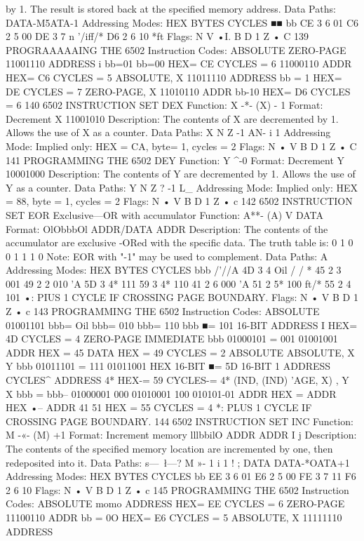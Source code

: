\documentclass{book}
\begin{document}
by 1. The result is stored back at the specified memory address.
Data Paths:
DATA-M5ATA-1
Addressing Modes:
HEX
BYTES
CYCLES
■■ bb
CE
3
6
01
C6
2
5
00
DE
3
7
n
'/iff/*
D6
2
6
10
*ft
Flags:
N V
•I.
B D 1 Z
•
C
139
PROGRAAAAAING THE 6502
Instruction Codes:
ABSOLUTE
ZERO-PAGE
11001110 ADDRESS
i
bb=01
bb=00
HEX= CE CYCLES = 6
11000110 ADDR
HEX= C6 CYCLES = 5
ABSOLUTE, X 11011110 ADDRESS
bb = 1 HEX= DE CYCLES = 7
ZERO-PAGE, X 11010110 ADDR
bb-10 HEX= D6 CYCLES = 6
140
6502 INSTRUCTION SET
DEX
Function:
X -*- (X) - 1
Format:
Decrement X
11001010
Description:
The contents of X are decremented by 1. Allows the use of X as
a counter.
Data Paths:
X
N
Z
-1
AN-
i
1
Addressing Mode:
Implied only:
HEX = CA, byte= 1, cycles = 2
Flags:
N
•
V B D 1 Z
•
C
141
PROGRAMMING THE 6502
DEY
Function:
Y ^-0
Format:
Decrement Y
10001000
Description:
The contents of Y are decremented by 1. Allows the use of Y as
a counter.
Data Paths:
Y
N
Z
{}?
-1
L_
Addressing Mode:
Implied only:
HEX = 88, byte = 1, cycles = 2
Flags:
N
•
V B D 1 Z
•
c
142
6502 INSTRUCTION SET
EOR Exclusive—OR with accumulator
Function:
A**- (A) V DATA
Format:
OlObbbOl ADDR/DATA ADDR
Description:
The contents of the accumulator are exclusive -ORed with the
specific data. The truth table is:
0
1
0
0
1
1
1
0
Note: EOR with "-1" may be used to complement.
Data Paths: A
Addressing Modes:
HEX
BYTES
CYCLES
bbb
/'//A
4D
3
4
Oil
/ / *
45
2
3
001
49
2
2
010
'A
5D
3
4*
111
59
3
4*
110
41
2
6
000
'A
51
2
5*
100
ft/*
55
2
4
101
•: PIUS 1 CYCLE IF CROSSING PAGE BOUNDARY.
Flags:
N
•
V B D 1 Z
•
c
143
PROGRAMMING THE 6502
Instruction Codes:
ABSOLUTE 01001101
bbb= Oil
bbb= 010
bbb= 110
bbb ■= 101
16-BIT ADDRESS
I
HEX= 4D CYCLES = 4
ZERO-PAGE
IMMEDIATE
bbb
01000101
= 001
01001001
ADDR
HEX = 45
DATA
HEX = 49 CYCLES = 2
ABSOLUTE
ABSOLUTE,
X
Y
bbb
01011101
= 111
01011001
HEX
16-BIT
■= 5D
16-BIT
1
ADDRESS
CYCLES^
ADDRESS
4*
HEX-= 59 CYCLES-= 4*
(IND,
(IND)
'AGE,
X)
, Y
X
bbb =
bbb--
01000001
000
01010001
100
010101-01
ADDR
HEX =
ADDR
HEX •--
ADDR
41
51
HEX = 55 CYCLES = 4
*: PLUS 1 CYCLE IF CROSSING PAGE BOUNDARY.
144
6502 INSTRUCTION SET
INC
Function:
M -«- (M) +1
Format:
Increment memory
lllbbilO ADDR ADDR I
j
Description:
The contents of the specified memory location are incremented
by one, then redeposited into it.
Data Paths:
s—\
\l—?
M »-
1
i 1
! ;
DATA DATA-*OATA+1
Addressing Modes:
HEX
BYTES
CYCLES
bb
EE
3
6
01
E6
2
5
00
FE
3
7
11
F6
2
6
10
Flags:
N
•
V B D 1 Z
•
c
145
PROGRAMMING THE 6502
Instruction Codes:
ABSOLUTE momo ADDRESS
HEX= EE CYCLES = 6
ZERO-PAGE 11100110 ADDR
bb = 0O HEX= E6 CYCLES = 5
ABSOLUTE, X 11111110 ADDRESS
\end{document}
